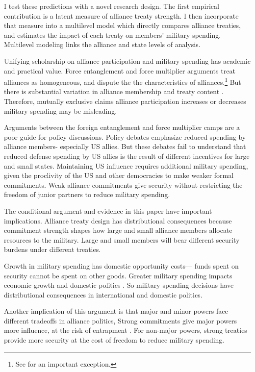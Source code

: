 \documentclass[12pt]{article}
\begin{document}
I test these predictions with a novel research design.
The first empirical contribution is a latent measure of alliance treaty strength. 
I then incorporate that measure into a multilevel model which directly compares alliance treaties, and estimates the impact of each treaty on members' military spending.
Multilevel modeling links the alliance and state levels of analysis.   


Unifying scholarship on alliance participation and military spending has academic and practical value.
Force entanglement and force multiplier arguments treat alliances as homogeneous, and dispute the the characteristics of alliances.\footnote{See \citet{DigiuseppePoast2016} for an important exception.} 
But there is substantial variation in alliance membership and treaty content \citep{Leedsetal2002}. 
Therefore, mutually exclusive claims alliance participation increases or decreases military spending may be misleading. 


Arguments between the foreign entanglement and force multiplier camps are a poor guide for policy discussions. 
Policy debates emphasize reduced spending by alliance members- especially US allies. 
But these debates fail to understand that reduced defense spending by US allies is the result of different incentives for large and small states. 
Maintaining US influence requires additional military spending, given the proclivity of the US and other democracies to make weaker formal commitments. 
Weak alliance commitments give security without restricting the freedom of junior partners to reduce military spending. 


The conditional argument and evidence in this paper have important implications. 
Alliance treaty design has distributional consequences because commitment strength shapes how large and small alliance members allocate resources to the military. 
Large and small members will bear different security burdens under different treaties.


Growth in military spending has domestic opportunity costs--- funds spent on security cannot be spent on other goods. 
Greater military spending impacts economic growth \citep{ShinWard1999, AlptekinLevine2012} and domestic politics \citep{Narizny2003, WhittenWilliams2011, Williams2015}.
So military spending decisions have distributional consequences in international and domestic politics. 


Another implication of this argument is that major and minor powers face different tradeoffs in alliance politics, 
Strong commitments give major powers more influence, at the risk of entrapment \citep{Benson2012}.
For non-major powers, strong treaties provide more security at the cost of freedom to reduce military spending. 
\end{document}
